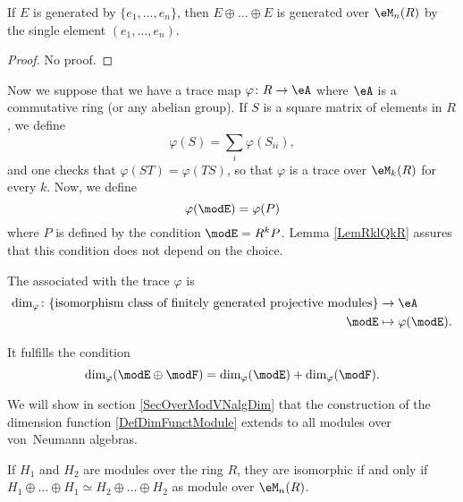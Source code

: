 \begin{lemma}		\label{LemFGenEEEsingleGen}
If $E$ is generated by $\{ e_1,\ldots, e_n \}$, then $E\oplus\ldots\oplus E$ is generated over $\eM_n(R)$ by the single element $(e_1,\ldots,e_n)$.
\end{lemma}
\begin{proof}
No proof.
\end{proof}


Now we suppose that we have a trace map $\varphi\colon R\to \eA$ where $\eA$ is a commutative ring (or any abelian group). If $S$ is a square matrix of elements in $R$, we define
\begin{equation}
	\varphi(S)=\sum_i\varphi(S_{ii}),
\end{equation}
and one checks that $\varphi(ST)=\varphi(TS)$, so that $\varphi$ is a trace over $\eM_k(R)$ for every $k$. Now, we define 
\begin{equation}			\label{EqPreDefDimModuleRA}
	\varphi(\modE)=\varphi(P)		
\end{equation}
where $P$ is defined by the condition $\modE=R^kP$. Lemma \ref{LemRklQkR} assures that this condition does not depend on the choice. 

\begin{definition}  \label{DefHDhfMGJ}
    The  associated with the trace $\varphi$ is
    \begin{equation}\label{DefDimFunctModule}
    \begin{aligned}
        \dim_{\varphi}\colon \{ \text{isomorphism class of finitely generated projective modules} \} &\to \eA\\
        \modE&\mapsto \varphi(\modE).
    \end{aligned}
    \end{equation}
\end{definition}

\begin{lemma}
    It fulfills the condition
    \begin{equation}
        \dim_{\varphi}(\modE\oplus \modF)=\dim_{\varphi}(\modE)+\dim_{\varphi}(\modF).
    \end{equation}
\end{lemma}
We will show in section \ref{SecOverModVNalgDim} that the construction of the dimension function \eqref{DefDimFunctModule} extends to all modules over von~Neumann algebras. 

\begin{lemma}
If $H_1$ and $H_2$ are modules over the ring $R$, they are isomorphic if and only if $H_1\oplus\ldots\oplus H_1\simeq H_2\oplus\ldots\oplus H_2$ as module over $\eM_n(R)$.
\end{lemma}


